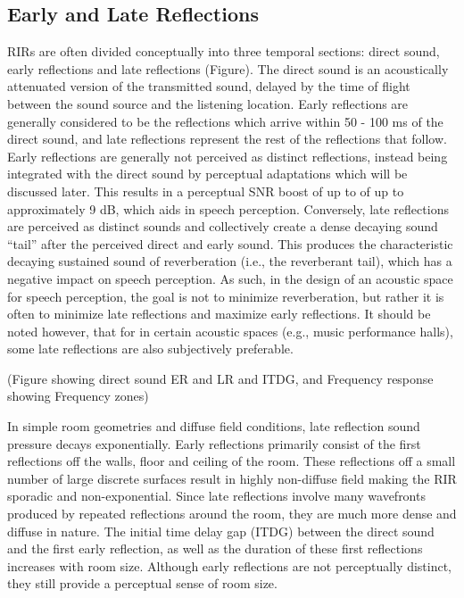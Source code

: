 \subsection{Early and Late Reflections}

RIRs are often divided conceptually into three temporal sections: direct sound, early reflections and late reflections (Figure). The direct sound is an acoustically attenuated version of the transmitted sound, delayed by the time of flight between the sound source and the listening location.  Early reflections are generally considered to be the reflections which arrive within 50 - 100 \unit{\milli\second} of the direct sound, and late reflections represent the rest of the reflections that follow.  Early reflections are generally not perceived as distinct reflections, instead being integrated with the direct sound by perceptual adaptations which will be discussed later. This results in a perceptual SNR boost of up to of up to approximately 9 dB, which aids in speech perception. Conversely, late reflections are perceived as distinct sounds and collectively create a dense decaying sound “tail” after the perceived direct and early sound. This produces the characteristic decaying sustained sound of reverberation (i.e., the reverberant tail), which has a negative impact on speech perception. As such, in the design of an acoustic space for speech perception, the goal is not to minimize reverberation, but rather it is often to minimize late reflections and maximize early reflections. It should be noted however, that for in certain acoustic spaces (e.g., music performance halls), some late reflections are also subjectively preferable. 

(Figure showing direct sound ER and LR and ITDG, and Frequency response showing Frequency zones)

In simple room geometries and diffuse field conditions, late reflection sound pressure decays exponentially. Early reflections primarily consist of the first reflections off the walls, floor and ceiling of the room. These reflections off a small number of large discrete surfaces result in highly non-diffuse field making the RIR sporadic and non-exponential. Since late reflections involve many wavefronts produced by repeated reflections around the room, they are much more dense and diffuse in nature. The initial time delay gap (ITDG) between the direct sound and the first early reflection, as well as the duration of these first reflections increases with room size. Although early reflections are not perceptually distinct, they still provide a perceptual sense of room size.

